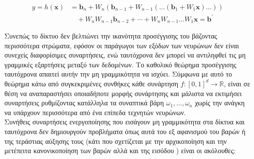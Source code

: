 \begin{align*}
    y = h(\mathbf{x}) &= \mathbf{b}_n + W_n\left(\mathbf{b}_{n-1} + W_{n-1}\left(\ldots\left(\mathbf{b}_1 + W_1 \mathbf{x}\right) \ldots\right)\right) \\
    &\quad + W_n W_{n-1} \mathbf{b}_{n-2} + \cdots + W_n W_{n-1} \ldots W_1 \mathbf{x} = \mathbf{b}^{\prime}
\end{align*}

Συνεπώς το δίκτυο δεν βελτιώνει την ικανότητα προσέγγισης του βάζοντας περισσότερα στρώματα, εφόσον οι παράγωγοι των εξόδων των νευρώνων δεν είναι συνεχείς διαφορίσιμες συναρτήσεις, ενώ ταυτόχρονα δεν μπορεί να αντιληφθεί τις μη γραμμικές εξαρτήσεις μεταξύ των δεδομένων.
Το καθολικό θεώρημα προσέγγισης ταυτόχρονα απαιτεί αυτήν την μη γραμμικότητα να ισχύει. Σύμφωνα με αυτό το θεώρημα κάτω από συγκεκριμένες συνθήκες κάθε συνάρτηση \(f:[0,1]^d \rightarrow \mathbb{R}\), είναι σε θέση να αναπαραστήσει οποιαδήποτε μορφής συνάρτησης και μάλιστα να εκτιμήσει συναρτήσεις ρυθμίζοντας κατάλληλα τα συναπτικά βάρη $\omega_{1},...,\omega_{n}$ χωρίς την ανάγκη να υπάρχουν περισσότερα από ένα επίπεδα τεχνητών νευρώνων. \\

Συνήθεις συναρτήσεις ενεργοποίησης που εισάγουν μη γραμμικότητα στα δίκτυα και ταυτόχρονα δεν δημιουργούν προβλήματα όπως αυτά του εξ αφανισμού του βαρών ή της τεράστιας αύξησης τους (κάτι που σχετίζεται με την αρχικοποίηση και την μετέπειτα κανονικοποίηση των βαρών αλλά και της εισόδου \cite{lecun1998gradient}) είναι οι ακόλουθες: \\

